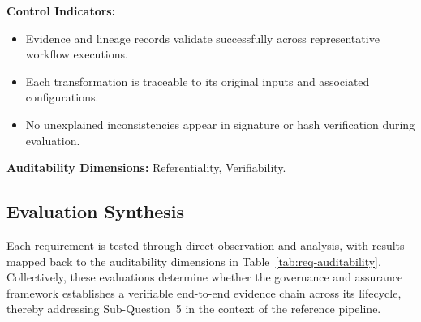 \textbf{Control Indicators:}
\begin{itemize}
  \item Evidence and lineage records validate successfully across representative
        workflow executions.
  \item Each transformation is traceable to its original inputs and associated
        configurations.
  \item No unexplained inconsistencies appear in signature or hash verification
        during evaluation.
\end{itemize}
\textbf{Auditability Dimensions:} Referentiality, Verifiability.

\subsection*{Evaluation Synthesis}
\noindent
Each requirement is tested through direct observation and analysis, with results
mapped back to the auditability dimensions in
Table~\ref{tab:req-auditability}. Collectively, these evaluations determine
whether the governance and assurance framework establishes a verifiable
end-to-end evidence chain across its lifecycle, thereby addressing
Sub-Question~5 in the context of the reference pipeline.
